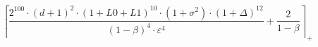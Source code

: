 \[\left\lceil \frac{2^{100} \cdot \left(d + 1\right)^{2} \cdot \left(1 + L0 + L1\right)^{10} \cdot \left(1 + \sigma^{2}\right) \cdot \left(1 + \Delta\right)^{12}}{\left(1 - \beta\right)^{4} \cdot \varepsilon^{4}} + \frac{2}{1 - \beta} \right\rceil_{+}\]
